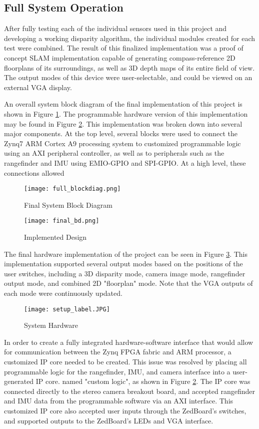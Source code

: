 \subsection{Full System Operation}
After fully testing each of the individual sensors used in this project and developing a working disparity algorithm, the individual modules created for each test were combined. The result of this finalized implementation was a proof of concept SLAM implementation capable of generating compass-reference 2D floorplans of its surroundings, as well as 3D depth maps of its entire field of view. The output modes of this device were user-selectable, and could be viewed on an external VGA display.
\par
An overall system block diagram of the final implementation of this project is shown in Figure \ref{systemBD2}. The programmable hardware version of this implementation may be found in Figure \ref{finalBD}. This implementation was broken down into several major components. At the top level, several blocks were used to connect the Zynq7 ARM Cortex A9 processing system to customized programmable logic using an AXI peripheral controller, as well as to peripherals such as the rangefinder and IMU using EMIO-GPIO and SPI-GPIO. At a high level, these connections allowed 
\par
\begin{figure}[H] 
	\centerline{
	\texttt{[image: full\_blockdiag.png]}
	}
	\caption{Final System Block Diagram}
	\label{systemBD2}
\end{figure}
\par
\begin{figure}[!htb] 
	\centerline{
	\texttt{[image: final\_bd.png]}
	}
	\caption{Implemented Design}
	\label{finalBD}
\end{figure}
\par
The final hardware implementation of the project can be seen in Figure 
\ref{finalHW}. This implementation supported several output modes based on the positions of the user switches, including a 3D disparity mode, camera image mode, rangefinder output mode, and combined 2D "floorplan" mode. Note that the VGA outputs of each mode were continuously updated. 
\begin{figure}[H]  
 	\centerline{
	\texttt{[image: setup\_label.JPG]}
	}
	\caption{System Hardware}
	\label{finalHW}
\end{figure}
\par
In order to create a fully integrated hardware-software interface that would allow for communication between the Zynq FPGA fabric and ARM processor, a customized IP core needed to be created. This issue was resolved by placing all programmable logic for the rangefinder, IMU, and camera interface into a user-generated IP core. named "custom logic", as shown in Figure \ref{finalBD}. The IP core was connected directly to the stereo camera breakout board, and accepted rangefinder and IMU data from the programmable software via an AXI interface. This customized IP core also accepted user inputs through the ZedBoard's switches, and supported outputs to the ZedBoard's LEDs and VGA interface. 
